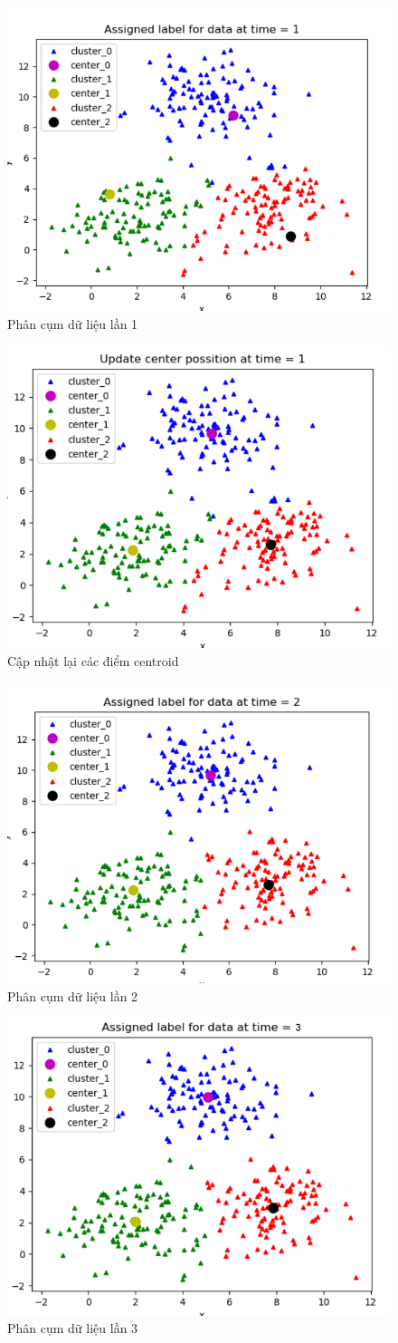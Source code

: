 \documentclass{article}
\begin{document}
	\newpage
	\begin{figure}[h]
		\centering
		\includegraphics[width=0.6\linewidth]{img/py_ex_3}
		\caption{Phân cụm dữ liệu lần 1}
	\end{figure}
	\begin{figure}[h]
		\centering
		\includegraphics[width=0.6\linewidth]{img/py_ex_4}
		\caption{Cập nhật lại các điểm centroid}
	\end{figure}
	\newpage
	\begin{figure}[h]
		\centering
		\includegraphics[width=0.6\linewidth]{img/py_ex_5}
		\caption{Phân cụm dữ liệu lần 2}
	\end{figure}
	\begin{figure}[h]
		\centering
		\includegraphics[width=0.6\linewidth]{img/py_ex_6}
		\caption{Phân cụm dữ liệu lần 3}
	\end{figure}
\end{document}
